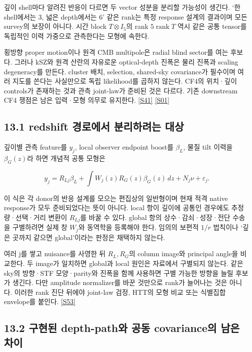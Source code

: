 \documentclass[11pt,a4paper]{article}
\begin{document}
깊이 shell마다 알려진 반응이 다르면 두 vector 성분을 분리할 가능성이 생긴다. ‘한 shell에서는 3, 넓은 depth에서는 6’ 같은 rank는 특정 response 설계의 결과이며 모든 survey의 보장이 아니다. 시간 block \(T\otimes I_5\)의 rank \(5\operatorname{rank}T\) 역시 같은 공통 tensor를 독립적인 이력 가중으로 관측한다는 모형에 속한다.


횡방향 proper motion이나 원격 CMB multipole은 radial blind sector를 여는 후보다. 그러나 kSZ와 원격 산란의 자유로운 optical-depth 진폭은 물리 진폭과 scaling degeneracy를 만든다. cluster 배치, selection, shared-sky covariance가 필수이며 여러 지도를 쓴다는 사실만으로 독립 likelihood를 곱하지 않는다. CF4의 위치·깊이 controls가 존재하는 것과 관측 joint-law가 준비된 것은 다르다. 기존 downstream CF4 쟁점은 남은 입력·모형 의무로 유지한다. \hyperlink{src:S41}{[S41]} \hyperlink{src:S01}{[S01]}


\subsection*{13.1 redshift 경로에서 분리하려는 대상}

깊이별 관측 feature를 \(y_j\), local observer endpoint boost를 \(\beta_L\), 물질 tilt 이력을 \(\beta_G(z)\)라 하면 개념적 공통 모형은


\[
y_j=R_{Lj}\beta_L+\int W_j(z)R_G(z)\beta_G(z)\,dz+N_j\nu+\varepsilon_j.
\]

이 식은 각 donor의 반응 설계를 모으는 편집상의 일반형이며 현재 적격 native response가 모두 준비되었다는 뜻이 아니다. local 항이 깊이에 공통인 경우에도 추정량·선택·거리 변환이 \(R_{Lj}\)를 바꿀 수 있다. global 항의 상수·감쇠·성장·전단 수송을 구별하려면 실제 창 \(W_j\)와 동역학을 등록해야 한다. 임의의 보편적 \(1/r\) 법칙이나 ‘깊은 곳까지 같으면 global’이라는 판정은 채택하지 않는다.


여러 j를 쌓고 nuisance를 사영한 뒤 \(R_L,R_G\)의 column image와 principal angle을 비교한다. 두 image가 일치하면 global과 local 원인은 자료에서 구별되지 않는다. 같은 sky의 방향·STF 모양·parity와 진폭을 함께 사용하면 구별 가능한 방향을 늘릴 후보가 생긴다. 다만 amplitude normalizer를 바꾼 것만으로 rank가 늘어나는 것은 아니다. 이러한 rank 진단 뒤에야 joint-law 검정, HTT의 모형 비교 또는 식별집합 envelope를 붙인다. \hyperlink{src:S53}{[S53]}


\subsection*{13.2 구현된 depth-path와 공동 covariance의 남은 차이}
\end{document}
